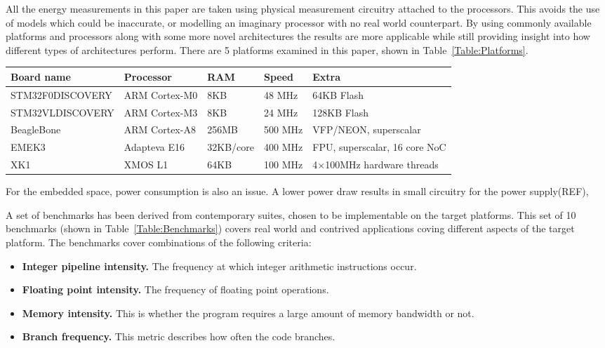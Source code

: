 \documentclass[twocolumn]{article}
\begin{document}
All the energy measurements in this paper are taken using physical measurement circuitry attached to the processors. This avoids the use of models which could be inaccurate, or modelling an imaginary processor with no real world counterpart. By using commonly available platforms and processors along with some more novel architectures the results are more applicable while still providing insight into how different types of architectures perform. There are 5 platforms examined in this paper, shown in Table~\ref{Table:Platforms}.

\begin{table*}
	\begin{tabular}{l l l l l}
		\textbf{Board name} & \textbf{Processor} & \textbf{RAM} & \textbf{Speed} & \textbf{Extra} \\
		\hline
		STM32F0DISCOVERY	& ARM Cortex-M0 		& 8KB		& 48 MHz		  & 64KB Flash\\
		STM32VLDISCOVERY	& ARM Cortex-M3 		& 8KB		& 24 MHz		  & 128KB Flash\\
		BeagleBone			& ARM Cortex-A8 		& 256MB		& 500 MHz		  & VFP/NEON, superscalar\\
		EMEK3				& Adapteva E16 			& 32KB/core & 400 MHz		  & FPU, superscalar, 16 core NoC\\
		XK1					& XMOS L1 				& 64KB		& 100 MHz 		& 4$\times$100MHz hardware threads \\
	\end{tabular}
	\caption{The platforms explored in this paper along with some relevant details.}
	\label{Table:Platforms}
\end{table*}


For the embedded space, power consumption is also an issue. A lower power draw results in small circuitry for the power supply(REF),


A set of benchmarks has been derived from contemporary suites, chosen to be implementable on the target platforms. This set of 10 benchmarks (shown in Table~\ref{Table:Benchmarks}) covers real world and contrived applications coving different aspects of the target platform. The benchmarks cover combinations of the following criteria:
\begin{itemize}
	\setlength{\itemsep}{0em}
	\vspace{-1mm}
	\item \textbf{Integer pipeline intensity.} The frequency at which integer arithmetic instructions occur.
	\item \textbf{Floating point intensity.} The frequency of floating point operations.
	\item \textbf{Memory intensity.} This is whether the program requires a large amount of memory bandwidth or not.
	\item \textbf{Branch frequency.} This metric describes how often the code branches.
\end{itemize}
\end{document}
